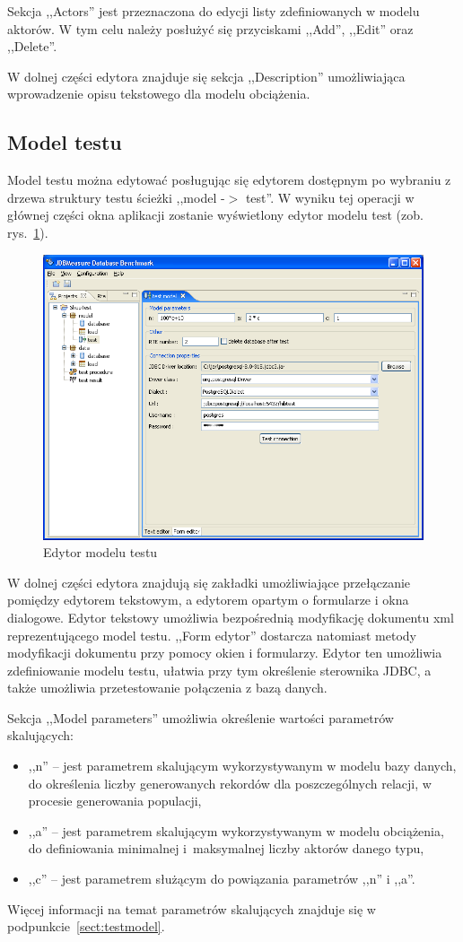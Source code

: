 Sekcja ,,Actors'' jest przeznaczona do edycji listy zdefiniowanych w modelu aktorów. W tym celu należy posłużyć się przyciskami
,,Add'', ,,Edit'' oraz ,,Delete''.

W dolnej części edytora znajduje się sekcja ,,Description'' umożliwiająca wprowadzenie opisu tekstowego dla modelu obciążenia.

\subsection{Model testu}
Model testu można edytować posługując się edytorem dostępnym po wybraniu z
drzewa struktury testu ścieżki ,,model -$>$ test''. W wyniku tej operacji w
głównej części okna aplikacji zostanie wyświetlony edytor modelu test (zob. rys.~\ref{rys:testedytor}).
\begin{figure}[h]
\begin{center}
\includegraphics[width=0.9\linewidth]{figures/gui/16.png}
\end{center}
\caption{Edytor modelu testu}\label{rys:testedytor}
\end{figure}
W dolnej części edytora znajdują się zakładki umożliwiające przełączanie
pomiędzy edytorem tekstowym, a edytorem opartym o formularze i okna dialogowe.
Edytor tekstowy umożliwia bezpośrednią modyfikację dokumentu xml reprezentującego model testu.
,,Form edytor'' dostarcza natomiast metody modyfikacji dokumentu przy pomocy okien i formularzy.
Edytor ten umożliwia zdefiniowanie modelu testu, ułatwia przy tym określenie sterownika JDBC,
a także umożliwia przetestowanie połączenia z bazą danych.

Sekcja ,,Model parameters'' umożliwia określenie wartości parametrów skalujących:
\begin{itemize}
\item ,,n'' -- jest parametrem skalującym wykorzystywanym w modelu bazy danych, do określenia liczby 
generowanych rekordów dla poszczególnych relacji, w procesie generowania populacji,
\item ,,a'' -- jest parametrem skalującym wykorzystywanym w modelu obciążenia, do definiowania minimalnej 
i~maksymalnej liczby aktorów danego typu,
\item ,,c'' -- jest parametrem służącym do powiązania parametrów ,,n'' i ,,a''.
\end{itemize}
Więcej informacji na temat parametrów skalujących znajduje się w podpunkcie~\ref{sect:testmodel}.

